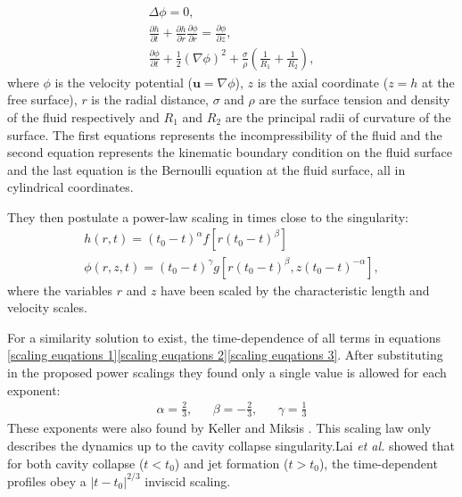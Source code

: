 \begin{gather}\label{scaling euqations 1}
    \Delta\phi=0,\\ \label{scaling euqations 2}
    \frac{\partial h}{\partial t}+\frac{\partial h}{\partial r}\frac{\partial \phi}{\partial r}=\frac{\partial \phi}{\partial z},\\ \label{scaling euqations 3}
    \frac{\partial \phi}{\partial t} + \frac{1}{2}(\nabla \phi)^2 + \frac{\sigma}{\rho}(\frac{1}{R_1}+\frac{1}{R_2}),
\end{gather}
where $\phi$ is the velocity potential ($\textbf{u}=\nabla \phi$), $z$ is the axial coordinate ($z=h$ at the free surface), $r$ is the radial distance, $\sigma$ and $\rho$ are the surface tension and density of the fluid respectively and $R_1$ and $R_2$ are the principal radii of curvature of the surface. The first equations represents the incompressibility of the fluid and the second equation represents the kinematic boundary condition on the fluid surface and the last equation is the Bernoulli equation at the fluid surface, all in cylindrical coordinates.

They then postulate a power-law scaling in times close to the singularity:
\begin{gather}\label{postulated 1}
    h(r,t)=(t_0-t)^{\alpha}f[r(t_0-t)^{\beta}]\\ \label{postulated 2}
    \phi(r,z,t)=(t_0-t)^{\gamma}g[r(t_0-t)^{\beta},z(t_0-t)^{-\alpha}],
\end{gather}
where the variables $r$ and $z$ have been scaled by the characteristic length and velocity scales.

For a similarity solution to exist, the time-dependence of all terms in equations \ref{scaling euqations 1}\ref{scaling euqations 2}\ref{scaling euqations 3}. After substituting in the proposed power scalings they found only a single value is allowed for each exponent:
\begin{align}
    \alpha=\frac{2}{3}, &&\beta = -\frac{2}{3}, && \gamma=\frac{1}{3}
\end{align}
These exponents were also found by Keller and Miksis \cite{keller1983surface}. This scaling law only describes the dynamics up to the cavity collapse singularity.Lai \textit{et al.} showed that for both cavity collapse ($t<t_0$) and jet formation ($t>t_0$), the time-dependent profiles obey a $|t-t_0|^{2/3}$ inviscid scaling\cite{lai2018bubble}.